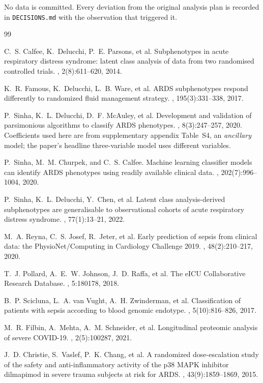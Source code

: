 \documentclass[11pt,letterpaper]{article}
\begin{document}
\sloppy
No data is committed. Every deviation from the original analysis plan is recorded in
\texttt{DECISIONS.md} with the observation that triggered it.

\begin{thebibliography}{99}

C.~S. Calfee, K.~Delucchi, P.~E. Parsons, et al.
\newblock Subphenotypes in acute respiratory distress syndrome: latent class analysis of
data from two randomised controlled trials.
, 2(8):611--620, 2014.

K.~R. Famous, K.~Delucchi, L.~B. Ware, et al.
\newblock ARDS subphenotypes respond differently to randomized fluid management strategy.
, 195(3):331--338, 2017.

P.~Sinha, K.~L. Delucchi, D.~F. McAuley, et al.
\newblock Development and validation of parsimonious algorithms to classify ARDS phenotypes.
, 8(3):247--257, 2020.
\newblock Coefficients used here are from supplementary appendix Table~S4, an
\emph{ancillary} model; the paper's headline three-variable model uses different variables.

P.~Sinha, M.~M. Churpek, and C.~S. Calfee.
\newblock Machine learning classifier models can identify ARDS phenotypes using readily
available clinical data.
, 202(7):996--1004, 2020.

P.~Sinha, K.~L. Delucchi, Y.~Chen, et al.
\newblock Latent class analysis-derived subphenotypes are generalisable to observational
cohorts of acute respiratory distress syndrome.
, 77(1):13--21, 2022.

M.~A. Reyna, C.~S. Josef, R.~Jeter, et al.
\newblock Early prediction of sepsis from clinical data: the PhysioNet/Computing in
Cardiology Challenge 2019.
, 48(2):210--217, 2020.

T.~J. Pollard, A.~E.~W. Johnson, J.~D. Raffa, et al.
\newblock The eICU Collaborative Research Database.
, 5:180178, 2018.

B.~P. Scicluna, L.~A. van Vught, A.~H. Zwinderman, et al.
\newblock Classification of patients with sepsis according to blood genomic endotype.
, 5(10):816--826, 2017.

M.~R. Filbin, A.~Mehta, A.~M. Schneider, et al.
\newblock Longitudinal proteomic analysis of severe COVID-19.
, 2(5):100287, 2021.

J.~D. Christie, S.~Vaslef, P.~K. Chang, et al.
\newblock A randomized dose-escalation study of the safety and anti-inflammatory activity of
the p38 MAPK inhibitor dilmapimod in severe trauma subjects at risk for ARDS.
, 43(9):1859--1869, 2015.

\end{thebibliography}
\end{document}
